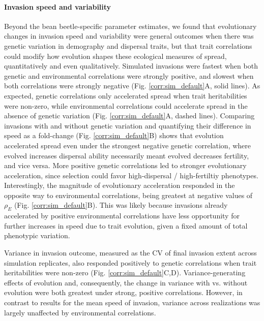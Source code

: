 \documentclass[11pt]{article}
\newcommand{\revise}[1]{{\color{Mahogany}{#1}}}
\begin{document}
\paragraph{Invasion speed and variability}
Beyond the bean beetle-specific parameter estimates, we found that evolutionary changes in invasion speed and variability were general outcomes when there was genetic variation in demography and dispersal traits, but that trait correlations could modify how evolution shapes these ecological measures of spread, quantitatively and even qualitatively.
Simulated invasions were fastest when both genetic and environmental correlations were strongly positive, and slowest when both correlations were strongly negative (Fig. \ref{corr:sim_default}A, solid lines).
As expected, genetic correlations only accelerated spread when trait heritabilities were non-zero, while environmental correlations could accelerate spread in the absence of genetic variation (Fig. \ref{corr:sim_default}A, dashed lines).
Comparing invasions with and without genetic variation and quantifying their difference in speed as a fold-change (Fig. \ref{corr:sim_default}B) shows that evolution accelerated spread even under the strongest negative genetic correlation, where evolved increases \revise{in} dispersal ability necessarily meant evolved decreases \revise{in} fertility, and vice versa.
More positive genetic correlations led to stronger evolutionary acceleration, since selection could favor high-dispersal / high-fertiltiy phenotypes.
Interestingly, the magnitude of evolutionary acceleration responded in the opposite way to environmental correlations, being greatest at negative values of $\rho_{E}$ (Fig. \ref{corr:sim_default}B).
This was likely because invasions already accelerated by positive environmental correlations have less opportunity for further increases in speed due to trait evolution, given a fixed amount of total phenotypic variation.

Variance in invasion outcome, measured as the CV of final invasion extent across simulation replicates, also responded positively to genetic correlations when trait heritabilities were non-zero (Fig. \ref{corr:sim_default}C,D).
Variance-generating effects of evolution and, consequently, the change in variance with vs. without evolution were both greatest under strong, positive correlations.
However, in contrast to results for the mean speed of invasion, variance across realizations was largely unaffected by environmental correlations.
\end{document}
